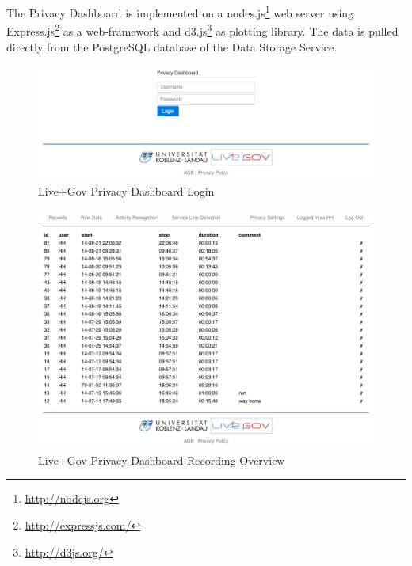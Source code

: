The Privacy Dashboard is implemented on a
nodes.js\footnote{\url{http://nodejs.org}} web server using
Express.js\footnote{\url{http://expressjs.com/}} as a web-framework
and d3.js\footnote{\url{http://d3js.org/}} as plotting library. The
data is pulled directly from the PostgreSQL database of the Data
Storage Service.

\begin{figure}
\includegraphics[width=\textwidth]{screenshots/login.png}
\caption{Live+Gov Privacy Dashboard Login}
\label{fig:PDLogin}
\end{figure}

\begin{figure}
\includegraphics[width=\textwidth]{screenshots/recordings.png}
\caption{Live+Gov Privacy Dashboard Recording Overview}
\label{fig:PDOverview}
\end{figure}

